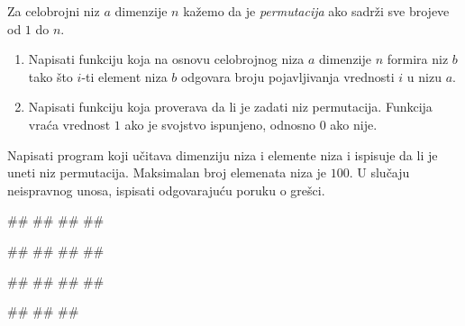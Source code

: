 \ifresenja
\begin{Answer}[ref=podniz]
\end{Answer}
\fi


\begin{Exercise}[label=permutacija] 
Za celobrojni niz $a$ dimenzije $n$ kažemo da je \textit{permutacija}
ako sadrži sve brojeve od $1$ do $n$.
\begin{enumerate}
\item Napisati funkciju 
  koja na osnovu celobrojnog niza $a$ dimenzije $n$ formira niz $b$
  tako što $i$-ti element niza $b$ odgovara broju pojavljivanja
  vrednosti $i$ u nizu $a$.
\item Napisati funkciju  koja
  proverava da li je zadati niz permutacija. Funkcija vraća vrednost
  $1$ ako je svojstvo ispunjeno, odnosno $0$ ako
  nije. 
\end{enumerate}
Napisati program koji učitava dimenziju niza i
elemente niza i ispisuje da li je uneti niz permutacija. 
Maksimalan broj elemenata niza je $100$.
U slučaju neispravnog unosa, ispisati odgovarajuću poruku o grešci. 

\begin{miditest}
\begin{upotreba}{1}
#\naslovInt#
##
##
##
\end{upotreba}
\end{miditest}
\begin{miditest}
\begin{upotreba}{2}
#\naslovInt#
##
##
##
\end{upotreba}
\end{miditest}

\begin{miditest}
\begin{upotreba}{3}
#\naslovInt#
##
##
##
\end{upotreba}
\end{miditest}
\begin{miditest}
\begin{upotreba}{4}
#\naslovInt#
##
##
\end{upotreba}
\end{miditest}
\end{Exercise}

